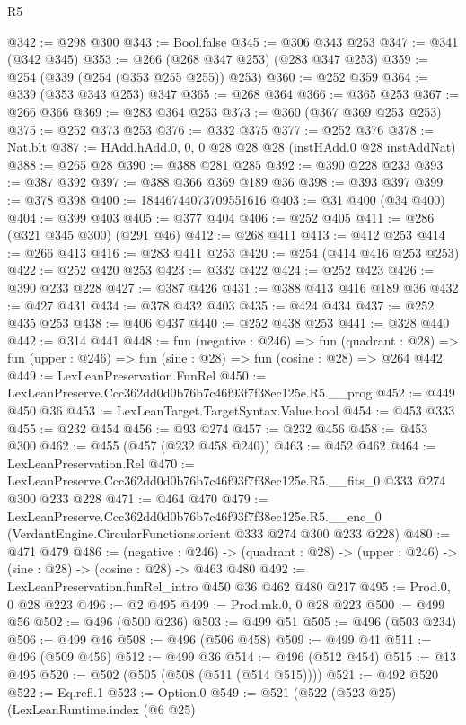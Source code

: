\begin{lexlean}{R5}
\begin{coremodule}
@342 := @298 @300
@343 := Bool.false
@345 := @306 @343 @253
@347 := @341 (@342 @345)
@353 := @266 (@268 @347 @253) (@283 @347 @253)
@359 := @254 (@339 (@254 (@353 @255 @255)) @253)
@360 := @252 @359
@364 := @339 (@353 @343 @253) @347
@365 := @268 @364
@366 := @365 @253
@367 := @266 @366
@369 := @283 @364 @253
@373 := @360 (@367 @369 @253 @253)
@375 := @252 @373 @253
@376 := @332 @375
@377 := @252 @376
@378 := Nat.blt
@387 := HAdd.hAdd.{0, 0, 0} @28 @28 @28 (instHAdd.{0} @28 instAddNat)
@388 := @265 @28
@390 := @388 @281 @285
@392 := @390 @228 @233
@393 := @387 @392
@397 := @388 @366 @369 @189 @36
@398 := @393 @397
@399 := @378 @398
@400 := 18446744073709551616
@403 := @31 @400 (@34 @400)
@404 := @399 @403
@405 := @377 @404
@406 := @252 @405
@411 := @286 (@321 @345 @300) (@291 @46)
@412 := @268 @411
@413 := @412 @253
@414 := @266 @413
@416 := @283 @411 @253
@420 := @254 (@414 @416 @253 @253)
@422 := @252 @420 @253
@423 := @332 @422
@424 := @252 @423
@426 := @390 @233 @228
@427 := @387 @426
@431 := @388 @413 @416 @189 @36
@432 := @427 @431
@434 := @378 @432 @403
@435 := @424 @434
@437 := @252 @435 @253
@438 := @406 @437
@440 := @252 @438 @253
@441 := @328 @440
@442 := @314 @441
@448 := fun (negative : @246) =>
  fun (quadrant : @28) => fun (upper : @246) => fun (sine : @28) => fun (cosine : @28) => @264 @442
@449 := LexLeanPreservation.FunRel
@450 := LexLeanPreserve.Ccc362dd0d0b76b7c46f93f7f38ec125e.R5.__prog
@452 := @449 @450 @36
@453 := LexLeanTarget.TargetSyntax.Value.bool
@454 := @453 @333
@455 := @232 @454
@456 := @93 @274
@457 := @232 @456
@458 := @453 @300
@462 := @455 (@457 (@232 @458 @240))
@463 := @452 @462
@464 := LexLeanPreservation.Rel
@470 := LexLeanPreserve.Ccc362dd0d0b76b7c46f93f7f38ec125e.R5.__fits_0 @333 @274 @300 @233 @228
@471 := @464 @470
@479 := LexLeanPreserve.Ccc362dd0d0b76b7c46f93f7f38ec125e.R5.__enc_0
    (VerdantEngine.CircularFunctions.orient @333 @274 @300 @233 @228)
@480 := @471 @479
@486 := (negative : @246) ->
  (quadrant : @28) -> (upper : @246) -> (sine : @28) -> (cosine : @28) -> @463 @480
@492 := LexLeanPreservation.funRel_intro @450 @36 @462 @480 @217
@495 := Prod.{0, 0} @28 @223
@496 := @2 @495
@499 := Prod.mk.{0, 0} @28 @223
@500 := @499 @56
@502 := @496 (@500 @236)
@503 := @499 @51
@505 := @496 (@503 @234)
@506 := @499 @46
@508 := @496 (@506 @458)
@509 := @499 @41
@511 := @496 (@509 @456)
@512 := @499 @36
@514 := @496 (@512 @454)
@515 := @13 @495
@520 := @502 (@505 (@508 (@511 (@514 @515))))
@521 := @492 @520
@522 := Eq.refl.{1}
@523 := Option.{0}
@549 := @521
    (@522
      (@523 @25)
      (LexLeanRuntime.index
        (@6 @25)

\end{coremodule}
\end{lexlean}
